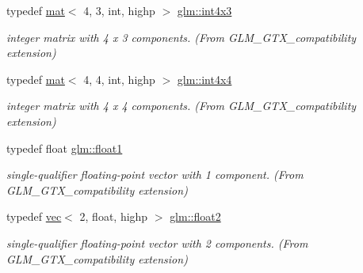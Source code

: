 \begin{DoxyCompactItemize}
\mbox{\label{group__gtx__compatibility_gadda7ab2670c41cbe997641db23ace3d2}} 
typedef \hyperlink{structglm_1_1mat}{mat}$<$ 4, 3, int, highp $>$ \hyperlink{group__gtx__compatibility_gadda7ab2670c41cbe997641db23ace3d2}{glm\+::int4x3}
\begin{DoxyCompactList}\small\item\em integer matrix with 4 x 3 components. (From G\+L\+M\+\_\+\+G\+T\+X\+\_\+compatibility extension) \end{DoxyCompactList}\item 
\mbox{\label{group__gtx__compatibility_ga4f4e5fb81339df0489d802fb9d574fd7}} 
typedef \hyperlink{structglm_1_1mat}{mat}$<$ 4, 4, int, highp $>$ \hyperlink{group__gtx__compatibility_ga4f4e5fb81339df0489d802fb9d574fd7}{glm\+::int4x4}
\begin{DoxyCompactList}\small\item\em integer matrix with 4 x 4 components. (From G\+L\+M\+\_\+\+G\+T\+X\+\_\+compatibility extension) \end{DoxyCompactList}\item 
\mbox{\label{group__gtx__compatibility_gae0ad1b0450320cda98bbbecb56bc3167}} 
typedef float \hyperlink{group__gtx__compatibility_gae0ad1b0450320cda98bbbecb56bc3167}{glm\+::float1}
\begin{DoxyCompactList}\small\item\em single-\/qualifier floating-\/point vector with 1 component. (From G\+L\+M\+\_\+\+G\+T\+X\+\_\+compatibility extension) \end{DoxyCompactList}\item 
\mbox{\label{group__gtx__compatibility_gaba973334bf704aa382f9b0dc06b59cf8}} 
typedef \hyperlink{structglm_1_1vec}{vec}$<$ 2, float, highp $>$ \hyperlink{group__gtx__compatibility_gaba973334bf704aa382f9b0dc06b59cf8}{glm\+::float2}
\begin{DoxyCompactList}\small\item\em single-\/qualifier floating-\/point vector with 2 components. (From G\+L\+M\+\_\+\+G\+T\+X\+\_\+compatibility extension) \end{DoxyCompactList}\item 
\mbox{\label{group__gtx__compatibility_ga8bbd0db121b50b0904f9a23adb3bbc45}} 

\end{DoxyCompactItemize}
